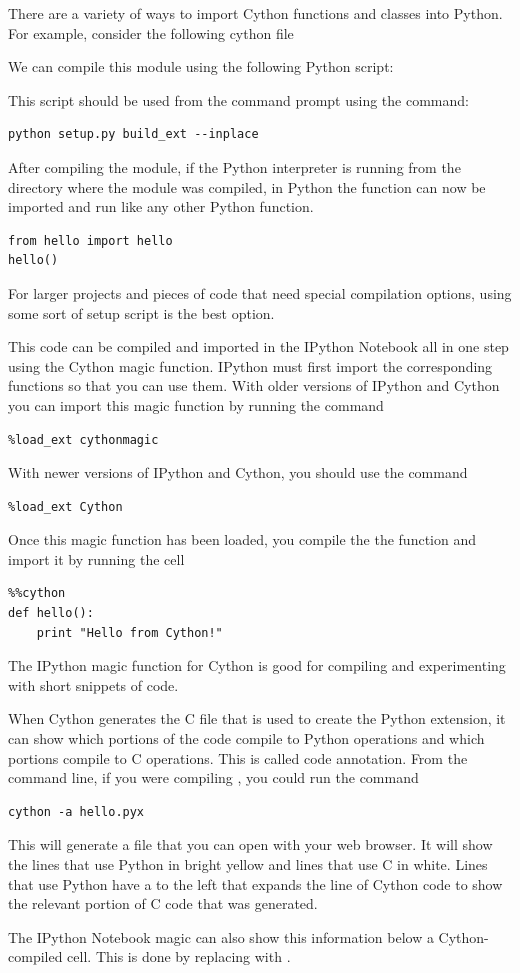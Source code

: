 There are a variety of ways to import Cython functions and classes into Python.
For example, consider the following cython file

We can compile this module using the following Python script:

This script should be used from the command prompt using the command:
\begin{lstlisting}[style=ShellInput]
python setup.py build_ext --inplace
\end{lstlisting}
After compiling the module, if the Python interpreter is running from the directory where the module was compiled, in Python the function can now be imported and run like any other Python function.
\begin{lstlisting}
from hello import hello
hello()
\end{lstlisting}
For larger projects and pieces of code that need special compilation options, using some sort of setup script is the best option.

This code can be compiled and imported in the IPython Notebook all in one step using the Cython magic function.
IPython must first import the corresponding functions so that you can use them.
With older versions of IPython and Cython you can import this magic function by running the command
\begin{lstlisting}
%load_ext cythonmagic
\end{lstlisting}
With newer versions of IPython and Cython, you should use the command
\begin{lstlisting}
%load_ext Cython
\end{lstlisting}
Once this magic function has been loaded, you compile the the  function and import it by running the cell
\begin{lstlisting}
%%cython
def hello():
    print "Hello from Cython!"
\end{lstlisting}
The IPython magic function for Cython is good for compiling and experimenting with short snippets of code.

\begin{info}
When Cython generates the C file that is used to create the Python extension, it can show which portions of the code compile to Python operations and which portions compile to C operations.
This is called code annotation.
From the command line, if you were compiling , you could run the command
\begin{lstlisting}[style=ShellInput]
cython -a hello.pyx
\end{lstlisting}
This will generate a  file that you can open with your web browser.
It will show the lines that use Python in bright yellow and lines that use C in white.
Lines that use Python have a \li{+} to the left that expands the line of Cython code to show the relevant portion of C code that was generated.

The IPython Notebook magic can also show this information below a Cython-compiled cell.
This is done by replacing  with .
\end{info}

